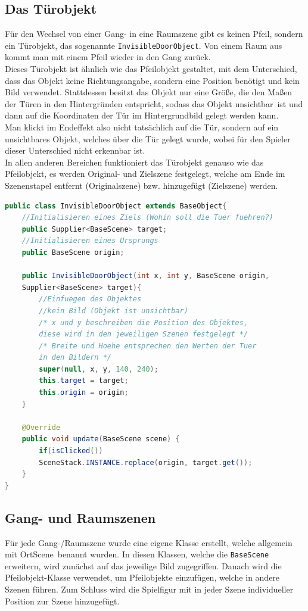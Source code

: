 \subsection{Das Türobjekt}
Für den Wechsel von einer Gang- in eine Raumszene gibt es keinen Pfeil, sondern ein Türobjekt, das sogenannte \texttt{InvisibleDoorObject}. Von einem Raum aus kommt man mit einem Pfeil wieder in den Gang zurück. \\
Dieses Türobjekt ist ähnlich wie das Pfeilobjekt gestaltet, mit dem Unterschied, dass das Objekt keine Richtungsangabe, sondern eine Position benötigt und kein Bild verwendet. Stattdessen besitzt das Objekt nur eine Größe, die den Maßen der Türen in den Hintergründen entspricht, sodass das Objekt \glqq unsichtbar\grqq\ ist und dann auf die Koordinaten der Tür im Hintergrundbild gelegt werden kann. \\
Man klickt im Endeffekt also nicht tatsächlich auf die Tür, sondern auf ein unsichtbares Objekt, welches über die Tür gelegt wurde, wobei für den Spieler dieser Unterschied nicht erkennbar ist. \\
In allen anderen Bereichen funktioniert das Türobjekt genauso wie das Pfeilobjekt, es werden Original- und Zielszene festgelegt, welche am Ende im Szenenstapel entfernt (Originalszene) bzw. hinzugefügt (Zielszene) werden.

\begin{lstlisting}[caption=InvisibleDoorObject, label=lst:invisibledoorobject, captionpos=t, language=Java]
public class InvisibleDoorObject extends BaseObject{
	//Initialisieren eines Ziels (Wohin soll die Tuer fuehren?)
	public Supplier<BaseScene> target;
	//Initialisieren eines Ursprungs
	public BaseScene origin;
		
	public InvisibleDoorObject(int x, int y, BaseScene origin, 
	Supplier<BaseScene> target){
		//Einfuegen des Objektes
		//kein Bild (Objekt ist unsichtbar)
		/* x und y beschreiben die Position des Objektes, 
		diese wird in den jeweiligen Szenen festgelegt */
		/* Breite und Hoehe entsprechen den Werten der Tuer 
		in den Bildern */
		super(null, x, y, 140, 240);
		this.target = target;
		this.origin = origin;
	}
		
	@Override
	public void update(BaseScene scene) {
		if(isClicked())
		SceneStack.INSTANCE.replace(origin, target.get());
	}
}
\end{lstlisting}

\subsection{Gang- und Raumszenen}
Für jede Gang-/Raumszene wurde eine eigene Klasse erstellt, welche allgemein mit \glqq OrtScene\grqq\ benannt wurden. In diesen Klassen, welche die \texttt{BaseScene} erweitern, wird zunächst auf das jeweilige Bild zugegriffen. Danach wird die Pfeilobjekt-Klasse verwendet, um Pfeilobjekte einzufügen, welche in andere Szenen führen. Zum Schluss wird die Spielfigur mit in jeder Szene individueller Position zur Szene hinzugefügt.

